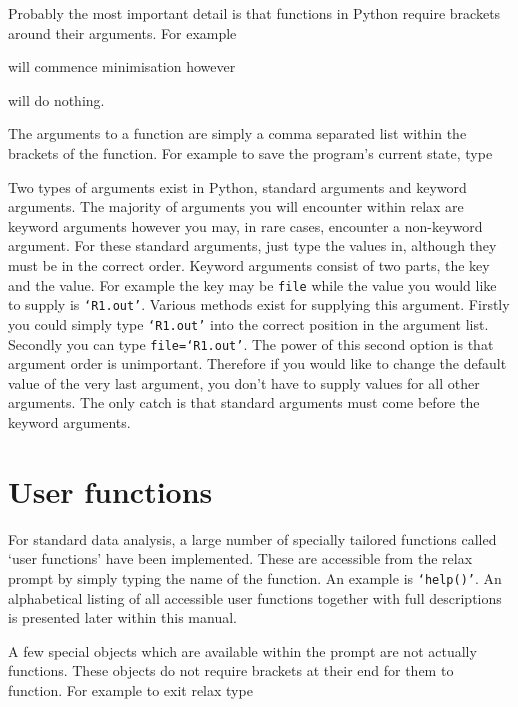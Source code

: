 Probably the most important detail is that functions in Python require brackets around their arguments.  For example


will commence minimisation however


will do nothing.

The arguments to a function are simply a comma separated list within the brackets of the function.  For example to save the program's current state, type


Two types of arguments exist in Python, standard arguments and keyword arguments.  The majority of arguments you will encounter within relax are keyword arguments however you may, in rare cases, encounter a non-keyword argument.  For these standard arguments, just type the values in, although they must be in the correct order.  Keyword arguments consist of two parts, the key and the value.  For example the key may be \texttt{file} while the value you would like to supply is \texttt{`R1.out'}.  Various methods exist for supplying this argument.  Firstly you could simply type \texttt{`R1.out'} into the correct position in the argument list.  Secondly you can type \texttt{file=`R1.out'}.  The power of this second option is that argument order is unimportant.  Therefore if you would like to change the default value of the very last argument, you don't have to supply values for all other arguments.  The only catch is that standard arguments must come before the keyword arguments.




\section{User functions}

For standard data analysis, a large number of specially tailored functions called `user functions' have been implemented.  These are accessible from the relax prompt by simply typing the name of the function.  An example is \texttt{`help()'}.  An alphabetical listing of all accessible user functions together with full descriptions is presented later within this manual.

A few special objects which are available within the prompt are not actually functions.  These objects do not require brackets at their end for them to function.  For example to exit relax type


